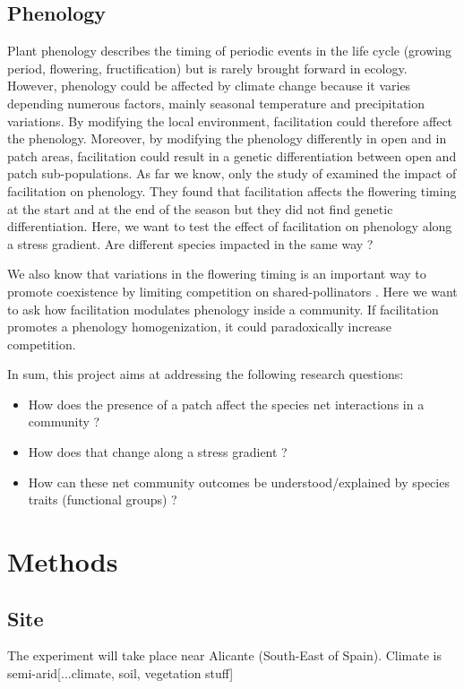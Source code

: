 \documentclass[12pt]{article} %
\begin{document}
\subsection{Phenology}
Plant phenology describes the timing of periodic events in the life cycle (growing period, flowering, fructification) but is rarely brought forward in ecology.
However, phenology could be affected by climate change \citep{Cleland2007} because it varies depending numerous factors, mainly seasonal temperature and precipitation variations. By modifying the local environment, facilitation could therefore affect the phenology. Moreover, by modifying the phenology differently in open and in patch areas, facilitation could result in a genetic differentiation between open and patch sub-populations. As far we know, only the study of \citet{Castellanos2014} examined the impact of facilitation on phenology. They found that facilitation affects the flowering timing at the start and at the end of the season but they did not find genetic differentiation. Here, we want to test the effect of facilitation on phenology along a stress gradient. Are different species impacted in the same way ?

We also know that variations in the flowering timing is an important way to promote coexistence by limiting competition on shared-pollinators \citep{Cleland2006}. Here we want to ask how facilitation modulates phenology inside a community. If facilitation promotes a phenology homogenization, it could paradoxically increase competition. 

In sum, this project aims at addressing the following research questions:
\begin{itemize}
	\item How does the presence of a patch affect the species net interactions in a community ?
	\item How does that change along a stress gradient ?
	\item How can these net community outcomes be understood/explained by species traits (functional groups) ?
\end{itemize}


\section{Methods}
\subsection{Site}
The experiment will take place near Alicante (South-East of Spain). Climate is semi-arid[...climate, soil, vegetation stuff]
\end{document}
